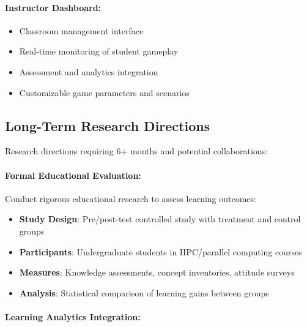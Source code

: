 \paragraph*{Instructor Dashboard:}

\begin{itemize}
    \item Classroom management interface
    \item Real-time monitoring of student gameplay
    \item Assessment and analytics integration
    \item Customizable game parameters and scenarios
\end{itemize}

\subsection{Long-Term Research Directions}
\label{subsec:long-term-research}

Research directions requiring 6+ months and potential collaborations:

\paragraph*{Formal Educational Evaluation:}

Conduct rigorous educational research to assess learning outcomes:

\begin{itemize}
    \item \textbf{Study Design}: Pre/post-test controlled study with treatment and control groups
    \item \textbf{Participants}: Undergraduate students in HPC/parallel computing courses
    \item \textbf{Measures}: Knowledge assessments, concept inventories, attitude surveys
    \item \textbf{Analysis}: Statistical comparison of learning gains between groups
\end{itemize}

\paragraph*{Learning Analytics Integration:}

